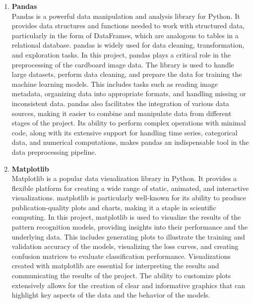 \begin{enumerate}
	\item \textbf{Pandas} \\
	Pandas is a powerful data manipulation and analysis library for Python. It provides data structures and functions needed to work with structured data, particularly in the form of DataFrames, which are analogous to tables in a relational database. pandas is widely used for data cleaning, transformation, and exploration tasks.
	In this project, pandas plays a critical role in the preprocessing of the cardboard image data. The library is used to handle large datasets, perform data cleaning, and prepare the data for training the machine learning models. This includes tasks such as reading image metadata, organizing data into appropriate formats, and handling missing or inconsistent data.
	pandas also facilitates the integration of various data sources, making it easier to combine and manipulate data from different stages of the project. Its ability to perform complex operations with minimal code, along with its extensive support for handling time series, categorical data, and numerical computations, makes pandas an indispensable tool in the data preprocessing pipeline.
	
	
	\item \textbf{Matplotlib} \\
	Matplotlib is a popular data visualization library in Python. It provides a flexible platform for creating a wide range of static, animated, and interactive visualizations. matplotlib is particularly well-known for its ability to produce publication-quality plots and charts, making it a staple in scientific computing.
	In this project, matplotlib is used to visualize the results of the pattern recognition models, providing insights into their performance and the underlying data. This includes generating plots to illustrate the training and validation accuracy of the models, visualizing the loss curves, and creating confusion matrices to evaluate classification performance.
	Visualizations created with matplotlib are essential for interpreting the results and communicating the results of the project. The ability to customize plots extensively allows for the creation of clear and informative graphics that can highlight key aspects of the data and the behavior of the models.
	

\end{enumerate}
